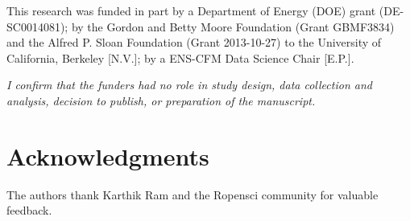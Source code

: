 \documentclass[9pt,a4paper,]{extarticle}
\begin{document}
This research was funded in part by a Department of Energy (DOE) grant
(DE-SC0014081); by the Gordon and Betty Moore Foundation (Grant GBMF3834) and
the Alfred P. Sloan Foundation (Grant 2013-10-27) to the University of
California, Berkeley {[}N.V.{]}; by a ENS-CFM Data Science Chair {[}E.P.{]}.

\emph{I confirm that the funders had no role in study design, data collection and
analysis, decision to publish, or preparation of the manuscript.}

\hypertarget{acknowledgments}{%
\section{Acknowledgments}\label{acknowledgments}}

The authors thank Karthik Ram and the Ropensci community for valuable
feedback.

\renewcommand\refname{References}
{\small}
\end{document}

